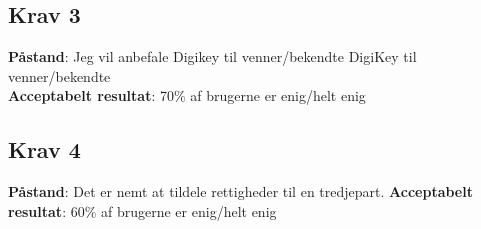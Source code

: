 \documentclass[12pt]{article}
\begin{document}
\subsection*{Krav 3}
\textbf{Påstand}: Jeg vil anbefale Digikey til venner/bekendte DigiKey til venner/bekendte\\
\textbf{Acceptabelt resultat}: 70\% af brugerne er enig/helt enig
\subsection*{Krav 4}
\textbf{Påstand}: Det er nemt at tildele rettigheder til en tredjepart.
\textbf{Acceptabelt resultat}: 60\% af brugerne er enig/helt enig
\end{document}
